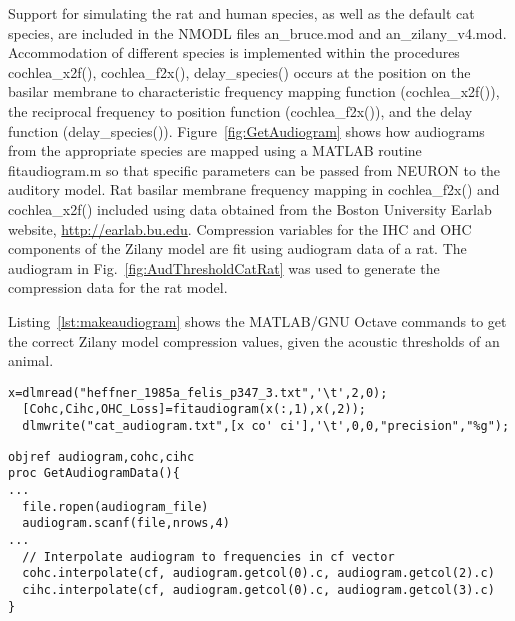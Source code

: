 Support for simulating the rat and human species, as well as the default cat
species, are included in the NMODL files \mbox{\textsf{an\_bruce.mod}} and
\mbox{\textsf{an\_zilany\_v4.mod}}.  Accommodation of different species is
implemented within the procedures \mbox{\textsf{cochlea\_x2f()}},
\mbox{\textsf{cochlea\_f2x()}}, \mbox{\textsf{delay\_species()}} occurs at the
position on the basilar membrane to characteristic frequency mapping function
(\mbox{\textsf{cochlea\_x2f()}}), the reciprocal frequency to position function
(\mbox{\textsf{cochlea\_f2x()}}), and the delay function
(\mbox{\textsf{delay\_species()}}).  Figure~\ref{fig:GetAudiogram} shows how
audiograms from the appropriate species are mapped using a MATLAB routine
\mbox{\textsf{fitaudiogram.m}} so that specific parameters can be passed from
NEURON to the auditory model.  Rat basilar membrane frequency mapping in
\mbox{\textsf{cochlea\_f2x()}} and \mbox{\textsf{cochlea\_x2f()}} included using
data obtained from the Boston University Earlab website,
\url{http://earlab.bu.edu}.  Compression variables for the IHC and OHC
components of the Zilany model are fit using audiogram data of a rat.  The
audiogram in Fig.~\ref{fig:AudThresholdCatRat} was used to generate the
compression data for the rat model.


Listing~\ref{lst:makeaudiogram} shows the MATLAB/GNU Octave commands to get the correct Zilany model compression values, given the acoustic thresholds of an animal.
\begin{lstlisting}[label=lst:makeaudiogram,caption=Using \mbox{\textsf{fitaudiogram.m}} to create COHC and CIHC vectors for the cat.]
  x=dlmread("heffner_1985a_felis_p347_3.txt",'\t',2,0);
  [Cohc,Cihc,OHC_Loss]=fitaudiogram(x(:,1),x(,2));
  dlmwrite("cat_audiogram.txt",[x co' ci'],'\t',0,0,"precision","%g");
\end{lstlisting}



\begin{lstlisting}[label=lst:getaudiogramdata,caption= Procedure to get audiogram data and interpolate to frequencies in \textsf{cf} vector (\mbox{\textsf{Utilities.hoc}})]
objref audiogram,cohc,cihc
proc GetAudiogramData(){
...
  file.ropen(audiogram_file)
  audiogram.scanf(file,nrows,4)
...
  // Interpolate audiogram to frequencies in cf vector
  cohc.interpolate(cf, audiogram.getcol(0).c, audiogram.getcol(2).c)
  cihc.interpolate(cf, audiogram.getcol(0).c, audiogram.getcol(3).c)
}
\end{lstlisting}

